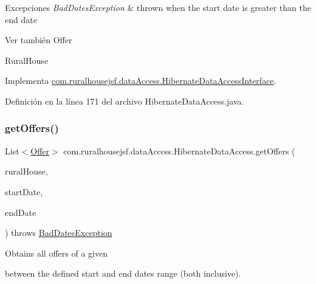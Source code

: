 \begin{DoxyExceptions}{Excepciones}
{\em Bad\+Dates\+Exception} & thrown when the start date is greater than the end date\\
\hline
\end{DoxyExceptions}
\begin{DoxySeeAlso}{Ver también}
Offer 

Rural\+House 
\end{DoxySeeAlso}


Implementa \mbox{\hyperlink{interfacecom_1_1ruralhousejsf_1_1data_access_1_1_hibernate_data_access_interface_a731ab9e6ef26732d453046c9630c677b}{com.\+ruralhousejsf.\+data\+Access.\+Hibernate\+Data\+Access\+Interface}}.



Definición en la línea 171 del archivo Hibernate\+Data\+Access.\+java.

\mbox{\label{classcom_1_1ruralhousejsf_1_1data_access_1_1_hibernate_data_access_ad428053d12fae95599312c13951f9c87}} 
\subsubsection{\texorpdfstring{getOffers()}{getOffers()}\hspace{0.1cm}{\footnotesize\ttfamily [2/2]}}
{\footnotesize\ttfamily List$<$\mbox{\hyperlink{classcom_1_1ruralhousejsf_1_1domain_1_1_offer}{Offer}}$>$ com.\+ruralhousejsf.\+data\+Access.\+Hibernate\+Data\+Access.\+get\+Offers (\begin{DoxyParamCaption}\item[{\mbox{\hyperlink{classcom_1_1ruralhousejsf_1_1domain_1_1_rural_house}{Rural\+House}}}]{rural\+House,  }\item[{Date}]{start\+Date,  }\item[{Date}]{end\+Date }\end{DoxyParamCaption}) throws \mbox{\hyperlink{classcom_1_1ruralhousejsf_1_1exceptions_1_1_bad_dates_exception}{Bad\+Dates\+Exception}}}

Obtains all offers of a given
\begin{DoxyCode}{0}
\end{DoxyCode}
 between the defined start and end dates range (both inclusive).


